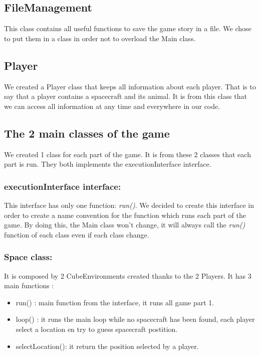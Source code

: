 \subsection{FileManagement}

This class contains all useful functions to save the game story in a file. 
We chose to put them in a class in order not to overload the Main class.

\subsection{Player}

We created a Player class that keeps all information about each player. 
That is to say that a player contains a spacecraft and its animal.
It is from this class that we can access all information at any time and everywhere in our code.

\subsection{The 2 main classes of the game}

We created 1 class for each part of the game. 
It is from these 2 classes that each part is run.
They both implements the executionInterface interface.

\subsubsection{executionInterface interface:}

This interface has only one function: \textit{run()}. 
We decided to create this interface in order to create a name convention for the function which runs each part of the game.
By doing this, the Main class won't change, it will always call the \textit{run()} function of each class even if each class change.

\subsubsection{Space class:}

It is composed by 2 CubeEnvironments created thanks to the 2 Players.
It has 3 main functions : 
\begin{itemize}
 \item run() : main function from the interface, it runs all game part 1.
 \item loop() : it runs the main loop while no spacecraft has been found, each player select a location en try to guess spacecraft postition.
 \item selectLocation(): it return the position selected by a player.
\end{itemize}

